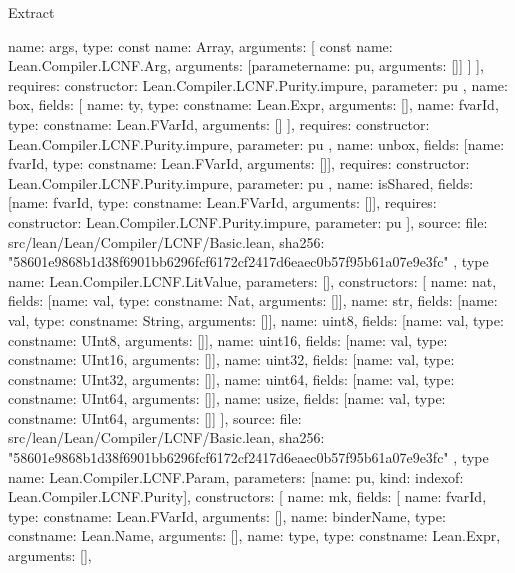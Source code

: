 \begin{lexlean}{Extract}
\begin{toolingmodule}
{{{            {
              name: args,
              type: const{
                name: Array,
                arguments: [
                  const{
                    name: Lean.Compiler.LCNF.Arg,
                    arguments: [parameter{name: pu, arguments: []}]
                  }
                ]
              }
            }
          ],
          requires: {constructor: Lean.Compiler.LCNF.Purity.impure, parameter: pu}
        },
        {
          name: box,
          fields: [
            {name: ty, type: const{name: Lean.Expr, arguments: []}},
            {name: fvarId, type: const{name: Lean.FVarId, arguments: []}}
          ],
          requires: {constructor: Lean.Compiler.LCNF.Purity.impure, parameter: pu}
        },
        {
          name: unbox,
          fields: [{name: fvarId, type: const{name: Lean.FVarId, arguments: []}}],
          requires: {constructor: Lean.Compiler.LCNF.Purity.impure, parameter: pu}
        },
        {
          name: isShared,
          fields: [{name: fvarId, type: const{name: Lean.FVarId, arguments: []}}],
          requires: {constructor: Lean.Compiler.LCNF.Purity.impure, parameter: pu}
        }
      ],
      source: {
        file: src/lean/Lean/Compiler/LCNF/Basic.lean,
        sha256: "58601e9868b1d38f6901bb6296fcf6172cf2417d6eaec0b57f95b61a07e9e3fc"
      }
    },
    type{
      name: Lean.Compiler.LCNF.LitValue,
      parameters: [],
      constructors: [
        {name: nat, fields: [{name: val, type: const{name: Nat, arguments: []}}]},
        {name: str, fields: [{name: val, type: const{name: String, arguments: []}}]},
        {name: uint8, fields: [{name: val, type: const{name: UInt8, arguments: []}}]},
        {name: uint16, fields: [{name: val, type: const{name: UInt16, arguments: []}}]},
        {name: uint32, fields: [{name: val, type: const{name: UInt32, arguments: []}}]},
        {name: uint64, fields: [{name: val, type: const{name: UInt64, arguments: []}}]},
        {name: usize, fields: [{name: val, type: const{name: UInt64, arguments: []}}]}
      ],
      source: {
        file: src/lean/Lean/Compiler/LCNF/Basic.lean,
        sha256: "58601e9868b1d38f6901bb6296fcf6172cf2417d6eaec0b57f95b61a07e9e3fc"
      }
    },
    type{
      name: Lean.Compiler.LCNF.Param,
      parameters: [{name: pu, kind: index{of: Lean.Compiler.LCNF.Purity}}],
      constructors: [
        {
          name: mk,
          fields: [
            {name: fvarId, type: const{name: Lean.FVarId, arguments: []}},
            {name: binderName, type: const{name: Lean.Name, arguments: []}},
            {name: type, type: const{name: Lean.Expr, arguments: []}},
}}}
\end{toolingmodule}
\end{lexlean}
